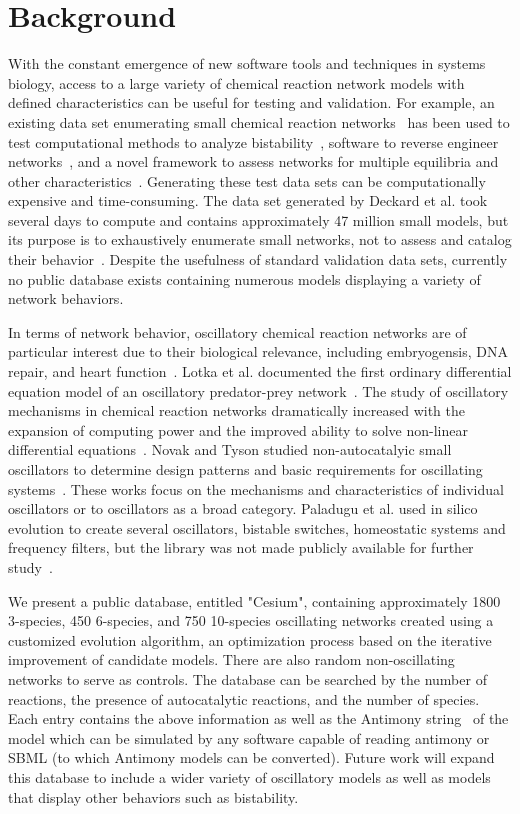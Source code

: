 \documentclass[12pt]{report}
\begin{document}
\section{Background}
With the constant emergence of new software tools and techniques in systems biology, access to a large variety of chemical reaction network models with defined characteristics can be useful for testing and validation. For example, an existing data set enumerating small chemical reaction networks~\cite{deckard2009} has been used to test computational methods to analyze bistability~\cite{pantea2010}, software to reverse engineer networks~\cite{nobile2013}, and a novel framework to assess networks for multiple equilibria and other characteristics~\cite{donnell2014}. Generating these test data sets can be computationally expensive and time-consuming. The data set generated by Deckard et al. took several days to compute and contains approximately 47 million small models, but its purpose is to exhaustively enumerate small networks, not to assess and catalog their behavior~\cite{deckard2009}.  Despite the usefulness of standard validation data sets, currently no public database exists containing numerous models displaying a variety of network behaviors.

In terms of network behavior, oscillatory chemical reaction networks are of particular interest due to their biological relevance, including embryogensis, DNA repair, and heart function~\cite{Novak2008,Aulehla2008,GevaZatorsky2006, Pol1928}. Lotka et al. documented the first ordinary differential equation model of an oscillatory predator-prey network~\cite{Lotka1910}. The study of oscillatory mechanisms in chemical reaction networks dramatically increased with the expansion of computing power and the improved ability to solve non-linear differential equations~\cite{Higgins1967}. Novak and Tyson studied non-autocatalyic small oscillators to determine design patterns and basic requirements for oscillating systems~\cite{Novak2008}. These works focus on the mechanisms and characteristics of individual oscillators or to oscillators as a broad category. Paladugu et al. used in silico evolution to create several oscillators, bistable switches, homeostatic systems and frequency filters, but the library was not made publicly available for further study~\cite{Paladugu2006}. 

We present a public database, entitled "Cesium",  containing approximately 1800 3-species, 450 6-species, and 750 10-species oscillating networks created using a customized evolution algorithm, an optimization process based on the iterative improvement of candidate models. There are also random non-oscillating networks to serve as controls. The database can be searched by the number of reactions, the presence of autocatalytic reactions, and the number of species. Each entry contains the above information as well as the Antimony string~\cite{Smith2009} of the model which can be simulated by any software capable of reading antimony or SBML (to which Antimony models can be converted). Future work will expand this database to include a wider variety of oscillatory models as well as models that display other behaviors such as bistability. 
\end{document}
